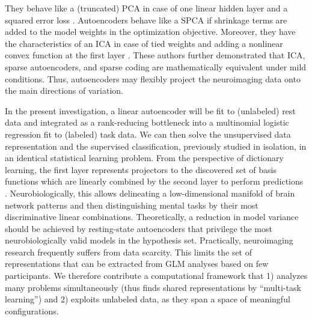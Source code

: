\documentclass{article} %
\begin{document}
They behave like a (truncated) PCA
in case of one linear hidden layer and a squared error loss
\cite{baldi1989neural}.
Autoencoders behave like a SPCA if shrinkage terms are added to the
model weights in the optimization objective.
Moreover, they have the characteristics of an ICA in case of tied weights
and adding a nonlinear convex function
at the first layer \cite{le2011ica}.
These authors further demonstrated that ICA, sparse autoencoders, and 
sparse coding are mathematically equivalent
under mild conditions.
%
Thus, autoencoders may flexibly project the neuroimaging data
onto the main directions of variation.

In the present investigation,
a linear autoencoder will be fit to
(unlabeled) rest data and
integrated as a rank-reducing bottleneck
into a multinomial
logistic regression fit to
(labeled) task data.
We can then solve the unsupervised data representation and the
supervised classification, previously studied in isolation,
in an identical statistical learning problem.
%
From the perspective of dictionary learning, the first layer represents
projectors to the discovered set of basis functions
which are linearly combined 
by the second layer to perform predictions \cite{olshausen96}.
%
Neurobiologically, this allows 
delineating a low-dimensional manifold
of brain network patterns and then 
distinguishing mental tasks
by their most discriminative linear combinations.
%
Theoretically, a reduction in model variance should be achieved by
resting-state autoencoders that
privilege the most neurobiologically
valid models in the hypothesis set.
%
Practically, neuroimaging research frequently suffers from
data scarcity. This limits the set of representations that can be
extracted from GLM analyses based on few participants.
%
We therefore contribute a computational framework that
1) analyzes many problems simultaneously
(thus finds shared representations by ``multi-task learning'')
and
2) exploits unlabeled data,
as they span a space of meaningful configurations.
\end{document}
